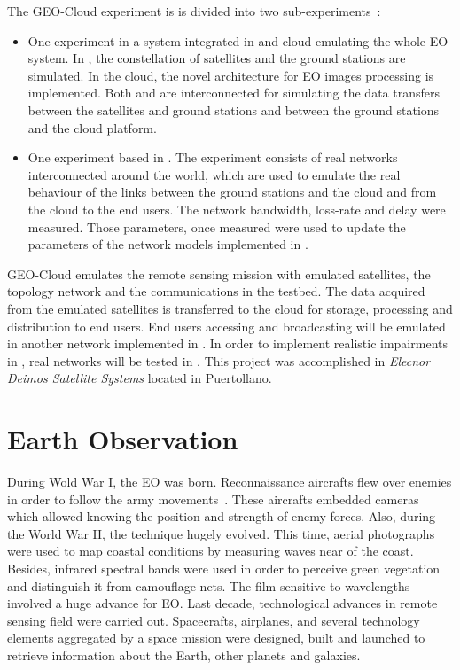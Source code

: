 The GEO-Cloud experiment is is divided into two sub-experiments~\cite{Perez2014}:
\begin{itemize}
\item One experiment in a system integrated in \vw and \bonfire cloud emulating
  the whole \ac{EO} system. In \vw, the constellation of satellites and the
  ground stations are simulated. In the \bonfire cloud, the novel architecture
  for \ac{EO} images processing is implemented. Both \vw and \bonfire are
  interconnected for simulating the data transfers between the satellites and
  ground stations and between the ground stations and the cloud platform.
\item One experiment based in \pl. The experiment consists of real networks
  interconnected around the world, which are used to emulate the real behaviour
  of the links between the ground stations and the cloud and from the cloud to
  the end users. The network bandwidth, loss-rate and delay were measured. Those
  parameters, once measured were used to update the parameters of the network
  models implemented in \vw.
\end{itemize}

GEO-Cloud  emulates the remote sensing mission with emulated satellites, the
topology network and the communications in the \vw testbed. The data
acquired from the emulated satellites is transferred to the \bonfire cloud
for storage, processing and distribution to end users. End users accessing and
broadcasting will be emulated in another network implemented in \vw. In
order to implement realistic impairments in \vw, real networks will be
tested in \pl. This project was accomplished in  \emph{Elecnor Deimos
  Satellite Systems} located in Puertollano. 

\section{Earth Observation}

During Wold War I, the \ac{EO} was born. Reconnaissance aircrafts flew over enemies in order to follow
the army movements~\cite{ESA2009}. These aircrafts embedded cameras which allowed knowing the position and strength of enemy forces. Also, during the World War II, the
technique hugely evolved. This time, aerial photographs were used to map coastal
conditions by measuring waves near of the coast. Besides, infrared spectral bands
were used in order to perceive  green vegetation and distinguish it from
camouflage nets. The film sensitive to wavelengths involved a huge advance for \ac{EO}.
Last decade, technological advances in remote sensing field were carried out. Spacecrafts, airplanes, and several technology
elements aggregated by a space mission were designed, built and launched to
retrieve information about the Earth, other planets and galaxies.

